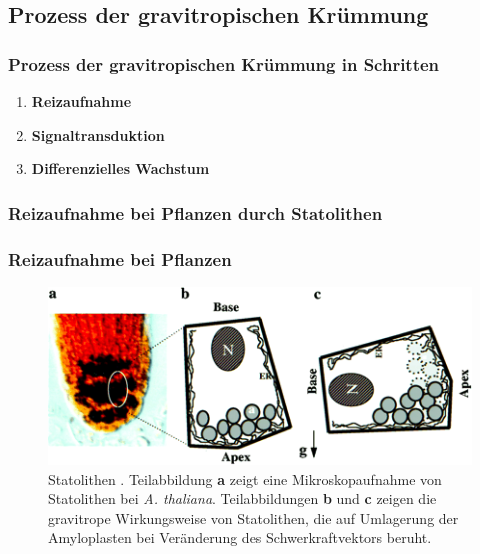 \documentclass[aspectratio=169
]{beamer}
\begin{document}
\subsection{Prozess der gravitropischen Krümmung}
	
\begin{frame}[<+(1)->]
\frametitle{Prozess der gravitropischen Krümmung in Schritten}
		
\begin{enumerate}
\item \textbf{Reizaufnahme} 
\item \textbf{Signaltransduktion}
\item \textbf{Differenzielles Wachstum}
\end{enumerate}
		
\end{frame}
		
\subsubsection{Reizaufnahme bei Pflanzen durch Statolithen}
		
\begin{frame}[<+(1)->]
\frametitle{Reizaufnahme bei Pflanzen}
		\begin{figure}[H]
			\centering 
			\includegraphics[width = 0.75\linewidth]{images/Statolithen2.png}
			\caption{Statolithen \parencite[345]{Chen1999}. Teilabbildung \textbf{a} zeigt eine Mikroskopaufnahme von Statolithen bei \emph{A. thaliana}. Teilabbildungen \textbf{b} und \textbf{c} zeigen die gravitrope Wirkungsweise von Statolithen, die auf Umlagerung der Amyloplasten bei Veränderung des Schwerkraftvektors beruht. \label{Statolithen}}
		\end{figure} 
	\end{frame}

% 
% 
\end{document}
